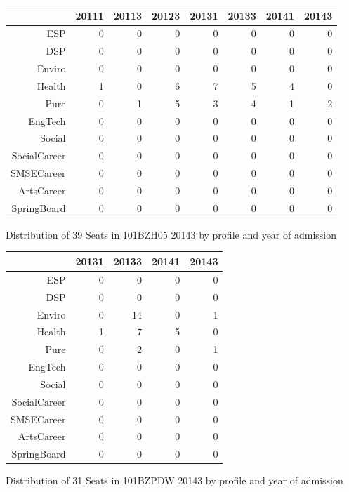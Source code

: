 \documentclass{article}\usepackage[]{graphicx}\usepackage[]{color}
\begin{document}
\begin{figure}[H]
\centering
\begin{tabular}{rrrrrrrr}
  \hline
 & 20111 & 20113 & 20123 & 20131 & 20133 & 20141 & 20143 \\ 
  \hline
ESP &   0 &   0 &   0 &   0 &   0 &   0 &   0 \\ 
  DSP &   0 &   0 &   0 &   0 &   0 &   0 &   0 \\ 
  Enviro &   0 &   0 &   0 &   0 &   0 &   0 &   0 \\ 
  Health &   1 &   0 &   6 &   7 &   5 &   4 &   0 \\ 
  Pure &   0 &   1 &   5 &   3 &   4 &   1 &   2 \\ 
  EngTech &   0 &   0 &   0 &   0 &   0 &   0 &   0 \\ 
  Social &   0 &   0 &   0 &   0 &   0 &   0 &   0 \\ 
  SocialCareer &   0 &   0 &   0 &   0 &   0 &   0 &   0 \\ 
  SMSECareer &   0 &   0 &   0 &   0 &   0 &   0 &   0 \\ 
  ArtsCareer &   0 &   0 &   0 &   0 &   0 &   0 &   0 \\ 
  SpringBoard &   0 &   0 &   0 &   0 &   0 &   0 &   0 \\ 
   \hline
\end{tabular}
\caption{Distribution of 39 Seats in 101BZH05 20143 by profile and year of admission} 
\end{figure}
\begin{figure}[H]
\centering
\begin{tabular}{rrrrr}
  \hline
 & 20131 & 20133 & 20141 & 20143 \\ 
  \hline
ESP &   0 &   0 &   0 &   0 \\ 
  DSP &   0 &   0 &   0 &   0 \\ 
  Enviro &   0 &  14 &   0 &   1 \\ 
  Health &   1 &   7 &   5 &   0 \\ 
  Pure &   0 &   2 &   0 &   1 \\ 
  EngTech &   0 &   0 &   0 &   0 \\ 
  Social &   0 &   0 &   0 &   0 \\ 
  SocialCareer &   0 &   0 &   0 &   0 \\ 
  SMSECareer &   0 &   0 &   0 &   0 \\ 
  ArtsCareer &   0 &   0 &   0 &   0 \\ 
  SpringBoard &   0 &   0 &   0 &   0 \\ 
   \hline
\end{tabular}
\caption{Distribution of 31 Seats in 101BZPDW 20143 by profile and year of admission} 
\end{figure}
\end{document}
